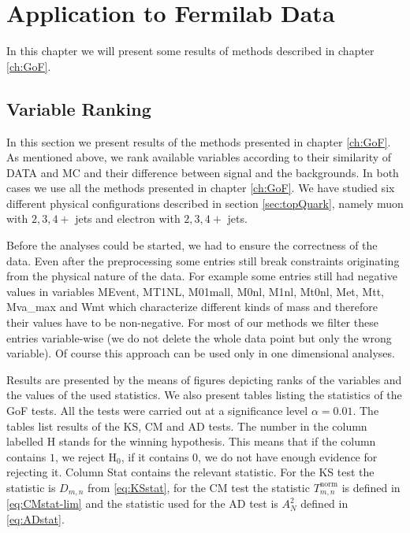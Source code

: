 \chapter{Application to Fermilab Data}



\noindent In this chapter we will present some results of methods described in chapter \ref{ch:GoF}.

\section{Variable Ranking}
In this section we present results  of the methods presented in chapter \ref{ch:GoF}. As mentioned above, we rank available variables according to their similarity of DATA and MC and their difference between signal and the backgrounds. In both cases we use all the methods presented in chapter \ref{ch:GoF}. We have studied six different physical configurations described in section \ref{sec:topQuark}, namely muon with $2, 3, 4+$ jets and electron with $2, 3, 4+$ jets.

Before the analyses could be started, we had to ensure the correctness of the data. Even after the preprocessing some entries still break constraints originating from the physical nature of the data. For example some entries still had negative values in variables \textsf{MEvent, MT1NL, M01mall, M0nl, M1nl, Mt0nl, Met, Mtt, Mva\_max} and \textsf{Wmt} which characterize different kinds of mass and therefore their values have to be non-negative. For most of our methods we filter these entries variable-wise (we do not delete the whole data point but only the wrong variable). Of course this approach can be used only in one dimensional analyses. 

Results are presented by the means of figures depicting ranks of the variables and the values of the used statistics. We also present tables listing the statistics of the GoF tests. All the tests were carried out at a significance level $\alpha = 0.01.$ The tables list results of the KS, CM and AD tests. The number in the column labelled \textsf{H} stands for the winning hypothesis. This means that if the column contains $1$, we reject $\mathrm{H}_0$, if it contains $0$, we do not have enough evidence for rejecting it. Column \textsf{Stat} contains the relevant statistic. For the KS test the statistic is $D_{m,n}$ from \eqref{eq:KSstat}, for the CM test the statistic $T^{\mathrm{norm}}_{m,n}$ is defined in \eqref{eq:CMstat-lim} and the statistic used for the AD test is $A_N^2$ defined in \eqref{eq:ADstat}. 

